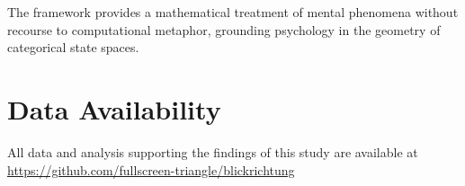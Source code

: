 \documentclass[twocolumn,amsmath,amssymb,aps,prl,superscriptaddress]{revtex4-2}
\begin{document}
The framework provides a mathematical treatment of mental phenomena without recourse to computational metaphor, grounding psychology in the geometry of categorical state spaces.

\section*{Data Availability}

All data and analysis supporting the findings of this study are available at \url{https://github.com/fullscreen-triangle/blickrichtung}


\end{document}
